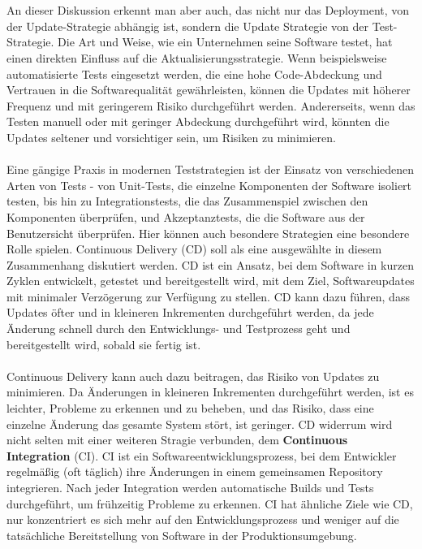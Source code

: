 \\\\ 
An dieser Diskussion erkennt man aber auch, das nicht nur das Deployment, von der Update-Strategie abhängig ist, sondern die Update Strategie von der Test-Strategie. Die Art und Weise, wie ein Unternehmen seine Software testet, hat einen direkten Einfluss auf die Aktualisierungsstrategie. Wenn beispielsweise automatisierte Tests eingesetzt werden, die eine hohe Code-Abdeckung und Vertrauen in die Softwarequalität gewährleisten, können die Updates mit höherer Frequenz und mit geringerem Risiko durchgeführt werden. Andererseits, wenn das Testen manuell oder mit geringer Abdeckung durchgeführt wird, könnten die Updates seltener und vorsichtiger sein, um Risiken zu minimieren.
\\\\
Eine gängige Praxis in modernen Teststrategien ist der Einsatz von verschiedenen Arten von Tests - von Unit-Tests, die einzelne Komponenten der Software isoliert testen, bis hin zu Integrationstests, die das Zusammenspiel zwischen den Komponenten überprüfen, und Akzeptanztests, die die Software aus der Benutzersicht überprüfen.
Hier können auch besondere Strategien eine besondere Rolle spielen. Continuous Delivery (CD) soll als eine ausgewählte in diesem Zusammenhang diskutiert werden. CD ist ein Ansatz, bei dem Software in kurzen Zyklen entwickelt, getestet und bereitgestellt wird, mit dem Ziel, Softwareupdates mit minimaler Verzögerung zur Verfügung zu stellen. CD kann dazu führen, dass Updates öfter und in kleineren Inkrementen durchgeführt werden, da jede Änderung schnell durch den Entwicklungs- und Testprozess geht und bereitgestellt wird, sobald sie fertig ist.
\\\\
Continuous Delivery kann auch dazu beitragen, das Risiko von Updates zu minimieren. Da Änderungen in kleineren Inkrementen durchgeführt werden, ist es leichter, Probleme zu erkennen und zu beheben, und das Risiko, dass eine einzelne Änderung das gesamte System stört, ist geringer. CD widerrum wird nicht selten mit einer weiteren Stragie verbunden, dem \textbf{Continuous Integration} (CI). CI ist ein Softwareentwicklungsprozess, bei dem Entwickler regelmäßig (oft täglich) ihre Änderungen in einem gemeinsamen Repository integrieren. Nach jeder Integration werden automatische Builds und Tests durchgeführt, um frühzeitig Probleme zu erkennen. CI hat ähnliche Ziele wie CD, nur konzentriert es sich mehr auf den Entwicklungsprozess und weniger auf die tatsächliche Bereitstellung von Software in der Produktionsumgebung. 
